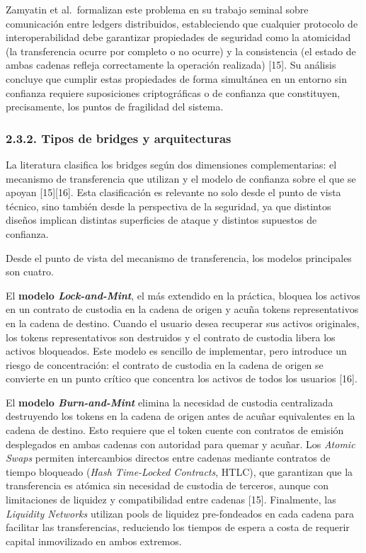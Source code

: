 Zamyatin et al.~formalizan este problema en su trabajo seminal sobre
comunicación entre ledgers distribuidos, estableciendo que cualquier
protocolo de interoperabilidad debe garantizar propiedades de seguridad
como la atomicidad (la transferencia ocurre por completo o no ocurre) y
la consistencia (el estado de ambas cadenas refleja correctamente la
operación realizada) {[}15{]}. Su análisis concluye que cumplir estas
propiedades de forma simultánea en un entorno sin confianza requiere
suposiciones criptográficas o de confianza que constituyen,
precisamente, los puntos de fragilidad del sistema.

\subsubsection{2.3.2. Tipos de bridges y
arquitecturas}\label{tipos-de-bridges-y-arquitecturas}

La literatura clasifica los bridges según dos dimensiones
complementarias: el mecanismo de transferencia que utilizan y el modelo
de confianza sobre el que se apoyan {[}15{]}{[}16{]}. Esta clasificación
es relevante no solo desde el punto de vista técnico, sino también desde
la perspectiva de la seguridad, ya que distintos diseños implican
distintas superficies de ataque y distintos supuestos de confianza.

Desde el punto de vista del mecanismo de transferencia, los modelos
principales son cuatro.

El \textbf{modelo \emph{Lock-and-Mint}}, el más extendido en la
práctica, bloquea los activos en un contrato de custodia en la cadena de
origen y acuña tokens representativos en la cadena de destino. Cuando el
usuario desea recuperar sus activos originales, los tokens
representativos son destruidos y el contrato de custodia libera los
activos bloqueados. Este modelo es sencillo de implementar, pero
introduce un riesgo de concentración: el contrato de custodia en la
cadena de origen se convierte en un punto crítico que concentra los
activos de todos los usuarios {[}16{]}.

El \textbf{modelo \emph{Burn-and-Mint}} elimina la necesidad de custodia
centralizada destruyendo los tokens en la cadena de origen antes de
acuñar equivalentes en la cadena de destino. Esto requiere que el token
cuente con contratos de emisión desplegados en ambas cadenas con
autoridad para quemar y acuñar. Los \emph{Atomic Swaps} permiten
intercambios directos entre cadenas mediante contratos de tiempo
bloqueado (\emph{Hash Time-Locked Contracts}, HTLC), que garantizan que
la transferencia es atómica sin necesidad de custodia de terceros,
aunque con limitaciones de liquidez y compatibilidad entre cadenas
{[}15{]}. Finalmente, las \emph{Liquidity Networks} utilizan pools de
liquidez pre-fondeados en cada cadena para facilitar las transferencias,
reduciendo los tiempos de espera a costa de requerir capital
inmovilizado en ambos extremos.

